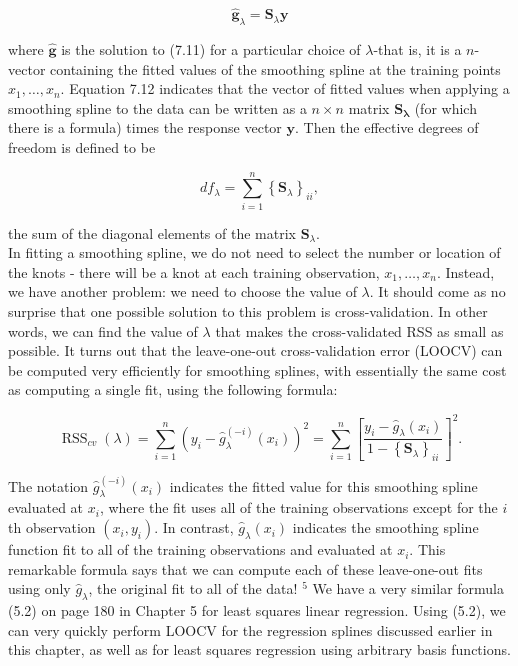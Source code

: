 \documentclass[10pt]{article}
\begin{document}
\begin{equation*}
\hat{\mathbf{g}}_{\lambda}=\mathbf{S}_{\lambda} \mathbf{y} \tag{7.12}
\end{equation*}


where $\hat{\mathbf{g}}$ is the solution to (7.11) for a particular choice of $\lambda$-that is, it is a $n$-vector containing the fitted values of the smoothing spline at the training points $x_{1}, \ldots, x_{n}$. Equation 7.12 indicates that the vector of fitted values when applying a smoothing spline to the data can be written as a $n \times n$ matrix $\mathbf{S}_{\boldsymbol{\lambda}}$ (for which there is a formula) times the response vector $\mathbf{y}$. Then the effective degrees of freedom is defined to be


\begin{equation*}
d f_{\lambda}=\sum_{i=1}^{n}\left\{\mathbf{S}_{\lambda}\right\}_{i i}, \tag{7.13}
\end{equation*}


the sum of the diagonal elements of the matrix $\mathbf{S}_{\lambda}$.\\
In fitting a smoothing spline, we do not need to select the number or location of the knots - there will be a knot at each training observation, $x_{1}, \ldots, x_{n}$. Instead, we have another problem: we need to choose the value of $\lambda$. It should come as no surprise that one possible solution to this problem is cross-validation. In other words, we can find the value of $\lambda$ that makes the cross-validated RSS as small as possible. It turns out that the leave-one-out cross-validation error (LOOCV) can be computed very efficiently for smoothing splines, with essentially the same cost as computing a single fit, using the following formula:

$$
\operatorname{RSS}_{c v}(\lambda)=\sum_{i=1}^{n}\left(y_{i}-\hat{g}_{\lambda}^{(-i)}\left(x_{i}\right)\right)^{2}=\sum_{i=1}^{n}\left[\frac{y_{i}-\hat{g}_{\lambda}\left(x_{i}\right)}{1-\left\{\mathbf{S}_{\lambda}\right\}_{i i}}\right]^{2} .
$$

The notation $\hat{g}_{\lambda}^{(-i)}\left(x_{i}\right)$ indicates the fitted value for this smoothing spline evaluated at $x_{i}$, where the fit uses all of the training observations except for the $i$ th observation $\left(x_{i}, y_{i}\right)$. In contrast, $\hat{g}_{\lambda}\left(x_{i}\right)$ indicates the smoothing spline function fit to all of the training observations and evaluated at $x_{i}$. This remarkable formula says that we can compute each of these leave-one-out fits using only $\hat{g}_{\lambda}$, the original fit to all of the data! ${ }^{5}$ We have a very similar formula (5.2) on page 180 in Chapter 5 for least squares linear regression. Using (5.2), we can very quickly perform LOOCV for the regression splines discussed earlier in this chapter, as well as for least squares regression using arbitrary basis functions.
\end{document}
